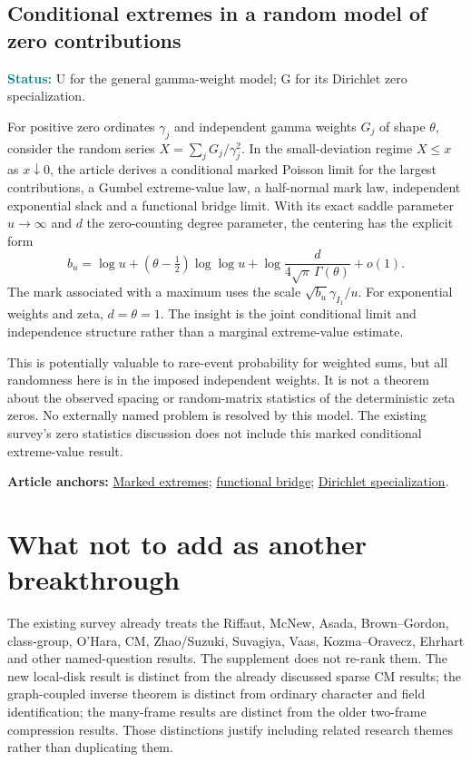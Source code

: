 \documentclass[11pt]{article}
\newcommand{\art}[3]{\href{https://github.com/VladimirReshetnikov/ProveIt/blob/3c4d27a69c98d09319a51e41a19fca05bb80a3e2/Analysis/GeneralizedRiemannHypothesis/Article/sections/#1.tex\#L#2}{#3}}
\newcommand{\status}[1]{\par\smallskip\noindent\textcolor{teal}{\textbf{Status:}} #1\par\smallskip}
\newcommand{\sources}[1]{\par\smallskip\noindent\textbf{Article anchors:} #1\par}
\begin{document}
\subsection{Conditional extremes in a random model of zero contributions}
\status{U for the general gamma-weight model; G for its Dirichlet zero specialization.}
For positive zero ordinates $\gamma_j$ and independent gamma weights $G_j$ of shape $\theta$, consider the random series $X=\sum_j G_j/\gamma_j^2$. In the small-deviation regime $X\le x$ as $x\downarrow0$, the article derives a conditional marked Poisson limit for the largest contributions, a Gumbel extreme-value law, a half-normal mark law, independent exponential slack and a functional bridge limit. With its exact saddle parameter $u\to\infty$ and $d$ the zero-counting degree parameter, the centering has the explicit form
\[
 b_u=\log u+(\theta-\tfrac12)\log\log u+
 \log\frac{d}{4\sqrt\pi\,\Gamma(\theta)}+o(1).
\]
The mark associated with a maximum uses the scale $\sqrt{b_u}\gamma_{I_1}/u$. For exponential weights and zeta, $d=\theta=1$. The insight is the joint conditional limit and independence structure rather than a marginal extreme-value estimate.

This is potentially valuable to rare-event probability for weighted sums, but all randomness here is in the imposed independent weights. It is not a theorem about the observed spacing or random-matrix statistics of the deterministic zeta zeros. No externally named problem is resolved by this model. The existing survey's zero statistics discussion does not include this marked conditional extreme-value result.
\sources{\art{ana}{3772}{Marked extremes}; \art{ana}{3919}{functional bridge}; \art{ana}{4001}{Dirichlet specialization}.}

\section{What not to add as another breakthrough}
The existing survey already treats the Riffaut, McNew, Asada, Brown--Gordon, class-group, O'Hara, CM, Zhao/Suzuki, Suvagiya, Vaas, Kozma--Oravecz, Ehrhart and other named-question results. The supplement does not re-rank them. The new local-disk result is distinct from the already discussed sparse CM results; the graph-coupled inverse theorem is distinct from ordinary character and field identification; the many-frame results are distinct from the older two-frame compression results. Those distinctions justify including related research themes rather than duplicating them.
\end{document}
